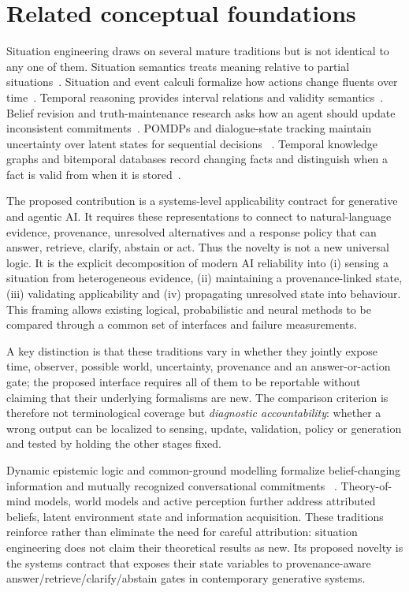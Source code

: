 \section*{Related conceptual foundations}

Situation engineering draws on several mature traditions but is not identical
to any one of them. Situation semantics treats meaning relative to partial
situations~\cite{barwise1983situations}. Situation and event calculi formalize
how actions change fluents over time~\cite{mccarthy1969problems,
kowalski1986event,reiter2001knowledge}. Temporal reasoning provides interval
relations and validity semantics~\cite{allen1983interval}. Belief revision and
truth-maintenance research asks how an agent should update inconsistent
commitments~\cite{alchourron1985logic,doyle1979truth}. POMDPs and dialogue-state
tracking maintain uncertainty over latent states for sequential decisions
~\cite{kaelbling1998pomdp,henderson2014second}. Temporal knowledge graphs and
bitemporal databases record changing facts and distinguish when a fact is valid
from when it is stored~\cite{snodgrass1992temporal}.

The proposed contribution is a systems-level applicability contract for
generative and agentic AI. It requires these representations to connect to
natural-language evidence, provenance, unresolved alternatives and a response
policy that can answer, retrieve, clarify, abstain or act. Thus the novelty is
not a new universal logic. It is the explicit decomposition of modern AI
reliability into (i) sensing a situation from heterogeneous evidence, (ii)
maintaining a provenance-linked state, (iii) validating applicability and
(iv) propagating unresolved state into behaviour. This framing allows existing
logical, probabilistic and neural methods to be compared through a common set of
interfaces and failure measurements.

A key distinction is that these traditions vary in whether they jointly expose
time, observer, possible world, uncertainty, provenance and an answer-or-action
gate; the proposed interface requires all of them to be reportable without
claiming that their underlying formalisms are new. The comparison criterion is
therefore not terminological coverage but \emph{diagnostic accountability}:
whether a wrong output can be localized to sensing, update, validation, policy
or generation and tested by holding the other stages fixed.


Dynamic epistemic logic and common-ground modelling formalize belief-changing
information and mutually recognized conversational commitments
~\cite{vanbenthem1996dynamic,stalnaker2002common}. Theory-of-mind models, world
models and active perception further address attributed beliefs, latent
environment state and information acquisition. These traditions reinforce rather
than eliminate the need for careful attribution: situation engineering does not
claim their theoretical results as new. Its proposed novelty is the systems
contract that exposes their state variables to provenance-aware
answer/retrieve/clarify/abstain gates in contemporary generative systems.
